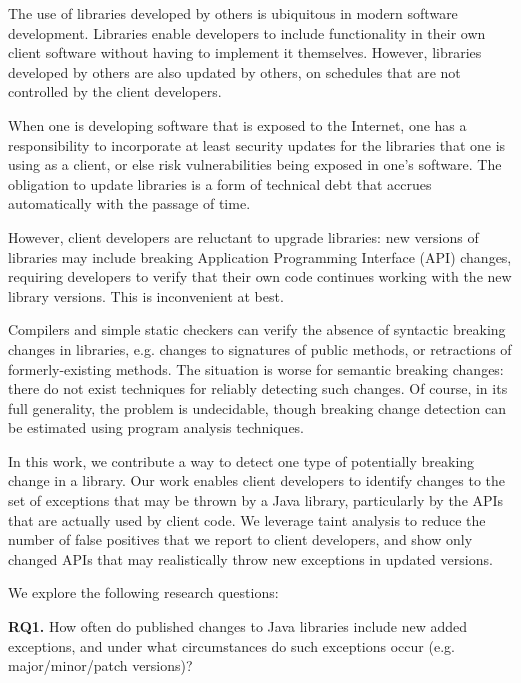 The use of libraries developed by others is ubiquitous in modern
software development. Libraries enable developers to include
functionality in their own client software without having to
implement it themselves.  However, libraries developed by others are
also updated by others, on schedules that are not controlled by the client developers.

When one is developing software that is exposed to the Internet, one
has a responsibility to incorporate at least security updates for the
libraries that one is using as a client, or else risk vulnerabilities
being exposed in one's software. The obligation to update libraries is
a form of technical debt that accrues automatically with the passage
of time.

However, client developers are reluctant to upgrade libraries: new
versions of libraries may include breaking Application Programming
Interface (API) changes, requiring developers to verify that their own
code continues working with the new library versions. This is
inconvenient at best.

Compilers and simple static checkers can verify the absence of
syntactic breaking changes in libraries, e.g. changes to signatures of
public methods, or retractions of formerly-existing methods. The
situation is worse for semantic breaking changes: there do not exist
techniques for reliably detecting such changes. Of course, in its full
generality, the problem is undecidable, though breaking change
detection can be estimated using program analysis techniques.


In this work, we contribute a way to detect one type of potentially breaking
change in a library. Our work enables client developers to identify changes
to the set of exceptions that may be thrown by a Java library, particularly
by the APIs that are actually used by client code. We leverage taint analysis
to reduce the number of false positives that we report to client developers,
and show only changed APIs that may realistically throw new exceptions
in updated versions. %

We explore the following research questions:

\noindent
{\bf RQ1.} How often do published changes to Java libraries include new added exceptions,
and under what circumstances do such exceptions occur (e.g. major/minor/patch versions)?

